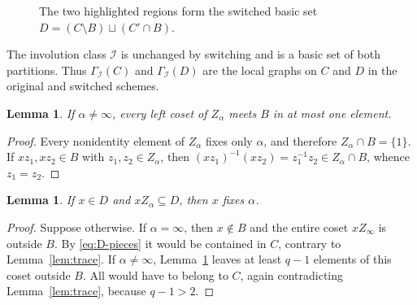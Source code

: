 \documentclass[11pt]{amsart}
\numberwithin{equation}{section}
\newtheorem{lemma}[theorem]{Lemma}
\theoremstyle{definition}
\theoremstyle{remark}
\newcommand{\I}{\mathcal I}
\begin{document}
\begin{figure}[htbp]
\centering
{}
\caption{The two highlighted regions form the switched basic set
$D=(C\setminus B)\sqcup(C'\cap B)$.}
\label{fig:switched-class-Cprime}
\end{figure}

The involution class $\I$ is unchanged by switching and is a basic set
of both partitions. Thus $\Gamma_{\I}(C)$ and $\Gamma_{\I}(D)$ are the local
graphs on $C$ and $D$ in the original and switched schemes.

\begin{lemma}\label{lem:coset-B}
If $\alpha\ne\infty$, every left coset of $Z_\alpha$ meets $B$
in at most one element.
\end{lemma}
\begin{proof}
Every nonidentity element of $Z_\alpha$ fixes only $\alpha$, and
therefore $Z_\alpha\cap B=\{1\}$. If $xz_1,xz_2\in B$ with
$z_1,z_2\in Z_\alpha$, then
$(xz_1)^{-1}(xz_2)=z_1^{-1}z_2\in Z_\alpha\cap B$, whence $z_1=z_2$.
\end{proof}

\begin{lemma}\label{lem:fixed-only}
If $x\in D$ and $xZ_\alpha\subseteq D$, then $x$ fixes $\alpha$.
\end{lemma}
\begin{proof}
Suppose otherwise. If $\alpha=\infty$, then $x\notin B$ and the
entire coset $xZ_\infty$ is outside $B$. By \eqref{eq:D-pieces} it
would be contained in $C$, contrary to Lemma~\ref{lem:trace}.
If $\alpha\ne\infty$, Lemma~\ref{lem:coset-B} leaves at least
$q-1$ elements of this coset outside $B$. All would have to belong
to $C$, again contradicting Lemma~\ref{lem:trace}, because $q-1>2$.
\end{proof}
\end{document}
